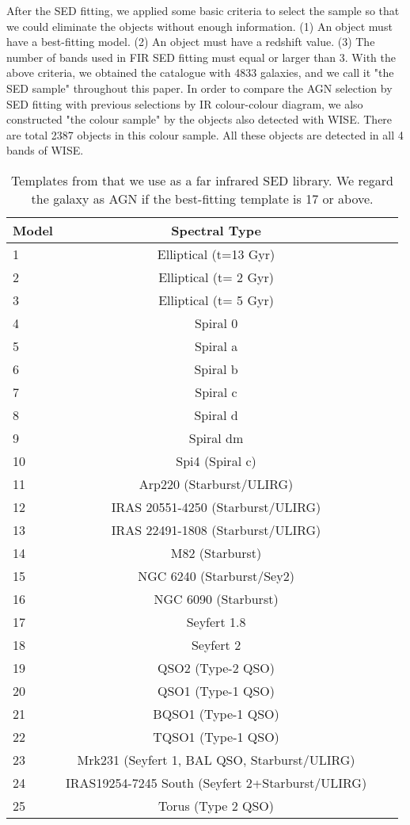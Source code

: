 \documentclass[a4paper,fleqn,usenatbib]{mnras}
\begin{document}
After the SED fitting, we applied some basic criteria to select the sample so that we could eliminate the objects without enough information. (1) An object must have a best-fitting model. (2) An object must have a redshift value. (3) The number of bands used in FIR SED fitting must equal or larger than 3.  With the above criteria, we obtained the catalogue with 4833 galaxies, and we call it "the SED sample" throughout this paper. In order to compare the AGN selection by SED fitting with previous selections by IR colour-colour diagram, we also constructed "the colour sample" by the objects also detected with WISE. There are total 2387 objects in this colour sample. All these objects are detected in all 4 bands of WISE.

\begin{table}
	\centering
	\caption{Templates from \citet{Polletta et al. 2007} that we use as a far infrared SED library. We regard the galaxy as AGN if the best-fitting template is 17 or above. }
	\label{tab:model}
	\begin{tabular}{lccr} %
		\hline
		Model & Spectral Type \\
		\hline
		1 & Elliptical (t=13 Gyr)  \\
		2 & Elliptical (t= 2 Gyr) \\
		3 & Elliptical (t= 5 Gyr) \\
		4 & Spiral 0 \\
		5 & Spiral a \\
		6 & Spiral b \\
		7 & Spiral c \\
		8 & Spiral d \\
		9 & Spiral dm \\
		10 & Spi4 (Spiral c) \\
		11 & Arp220 (Starburst/ULIRG) \\
		12 & IRAS 20551-4250 (Starburst/ULIRG) \\
		13 & IRAS 22491-1808 (Starburst/ULIRG) \\
		14 & M82 (Starburst) \\
		15 & NGC 6240 (Starburst/Sey2) \\
		16 & NGC 6090 (Starburst) \\
		17 & Seyfert 1.8 \\
		18 & Seyfert 2  \\
		19 & QSO2 (Type-2 QSO) \\
		20 & QSO1 (Type-1 QSO) \\
		21 & BQSO1 (Type-1 QSO) \\
		22 & TQSO1 (Type-1 QSO) \\
		23 & Mrk231 (Seyfert 1, BAL QSO, Starburst/ULIRG)  \\
		24 & IRAS19254-7245 South (Seyfert 2+Starburst/ULIRG) \\
		25 & Torus (Type 2 QSO)\\
		\hline
	\end{tabular}
\end{table}
\end{document}

